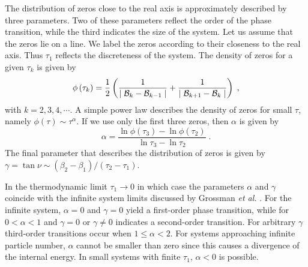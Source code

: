 \documentclass[rmp,aps,floatfix]{revtex4}
\begin{document}
The distribution of zeros close to the real axis is approximately described
by three parameters. Two of these parameters reflect the order of the
phase transition, while the third indicates the size of the system. 
Let us assume that the zeros lie on a line. We label the zeros according
to their closeness to the real axis. Thus $\tau_1$ reflects the discreteness
of the system. The density of zeros for a given $\tau_k$ is given by
\begin{equation}
\phi\left(\tau_k\right)=\frac{1}{2}
\left(\frac{1}{\mid {\cal B}_k -{\cal B}_{k-1}\mid} + 
\frac{1}{\mid {\cal B}_{k+1}-{\cal B}_k \mid}\right)\;,
\end{equation}
with $k=2,3,4,\cdots$. A simple power law describes the density of
zeros for small $\tau$, namely $\phi(\tau)\sim \tau^\alpha$. If we use
only the first three zeros, then $\alpha$ is given by
\begin{equation}
\alpha=\frac{\ln \phi(\tau_3) - \ln\phi(\tau_2)}{\ln\tau_3 -\ln\tau_2}\;.
\end{equation}
The final parameter that describes the distribution of zeros is given
by $\gamma=\tan\nu\sim (\beta_2-\beta_1)/(\tau_2-\tau_1)$. 

In the thermodynamic limit $\tau_1\rightarrow 0$ in which case the parameters
$\alpha$ and $\gamma$ coincide with the infinite system limits discussed 
by Grossman {\it et al.} \cite{gr67,gr69,gl69}. For the infinite system,
$\alpha=0$ and $\gamma=0$ yield a first-order phase transition, while
for $0<\alpha<1$ and $\gamma=0$ or $\gamma\ne 0$ indicates a second-order
transition. For arbitrary $\gamma$ third-order transitions occur when 
$1 \le \alpha < 2$. For systems approaching infinite particle number, 
$\alpha$ cannot be smaller than zero since this causes a divergence of the
internal energy. In small systems with finite $\tau_1$, $\alpha<0$ is 
possible. 
\end{document}
